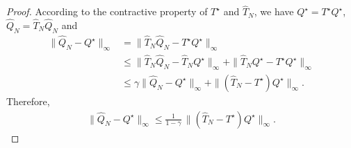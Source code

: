 \documentclass[letterpaper, 10 pt, conference]{ieeeconf}  %
\begin{document}
\begin{proof}
According to the contractive property of $T^\star$ and $\hat{T}_N$, we have $Q^\star=T^\star Q^\star$, $\hat Q_N=\hat{T}_N\hat Q_N$ and
\begin{align*}
\|\hat Q_N-Q^\star\|_\infty
&= \|\hat{T}_N\hat Q_N - T^\star Q^\star\|_\infty \\
&\le \|\hat{T}_N\hat Q_N - \hat{T}_N Q^\star\|_\infty
    + \|\hat{T}_N Q^\star - T^\star Q^\star\|_\infty \\
&\le \gamma \|\hat Q_N-Q^\star\|_\infty + \|(\hat{T}_N-T^\star )Q^\star\|_\infty.
\end{align*}
Therefore,
\begin{align}\label{eq: Q and T}
\|\hat Q_N-Q^\star\|_\infty \le \frac{1}{1-\gamma}\,\|(\hat{T}_N-T^\star)Q^\star\|_\infty.
\end{align}


\end{proof}
\end{document}
